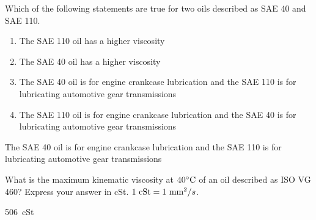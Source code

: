 \documentclass[multi,preview,varwidth=false,border=5,12pt]{standalone}
\begin{document}
\begin{question}

Which of the following statements are true for two oils described as SAE 40 and SAE 110.

\begin{enumerate}
  \item The SAE 110 oil has a higher viscosity
  \item The SAE 40 oil has a higher viscosity
  \item The SAE 40 oil is for engine crankcase lubrication and the SAE 110 is for lubricating automotive gear transmissions
  \item The SAE 110 oil is for engine crankcase lubrication and the SAE 40 is for lubricating automotive gear transmissions
\end{enumerate}

\begin{solution}
The SAE 40 oil is for engine crankcase lubrication and the SAE 110 is for lubricating automotive gear transmissions
\end{solution}

\end{question}

\begin{question}

What is the maximum kinematic viscosity at $40^\circ {\rm C}$ of an oil described as ISO VG 460?  Express your answer in cSt.  $1~{\rm cSt}=1~{\rm mm}^2/s$.

\begin{solution}
506~cSt
\end{solution}

\end{question}
\end{document}
